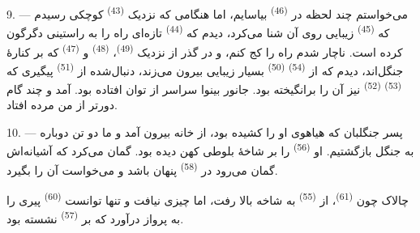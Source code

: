 \VUsaut{3.0mm}
\VUsaut{3.0mm}

9. --- می‌خواستم چند لحظه در 
\textsuperscript{(46)} بیاسایم، اما هنگامی که نزدیک 
\textsuperscript{(43)} کوچکی رسیدم که  \textsuperscript{(45)}
زیبایی روی آن شنا می‌کرد، دیدم که  \textsuperscript{(44)}
تازه‌ای راه را به  راستینی دگرگون کرده است. ناچار شدم
راه را کج کنم، و در گذر از نزدیک 
\textsuperscript{(49)}،  \textsuperscript{(48)} و
 \textsuperscript{(47)} که بر کنارهٔ جنگل‌اند، دیدم که
از  \textsuperscript{(54)} 
\textsuperscript{(50)} بسیار زیبایی بیرون می‌زند، دنبال‌شده از  \textsuperscript{(51)} پیگیری که 
\textsuperscript{(53)}  \textsuperscript{(52)} نیز
آن را برانگیخته بود. جانور بینوا سراسر از توان افتاده بود. آمد و چند
گام دورتر از من مرده افتاد.

10. --- پسر جنگلبان که هیاهوی  او را کشیده بود، از
خانه بیرون آمد و ما دو تن دوباره به جنگل بازگشتیم. او 
\textsuperscript{(56)} را بر شاخهٔ بلوطی کهن دیده بود. گمان می‌کرد که
آشیانه‌اش گمان می‌رود در  \textsuperscript{(58)}
پنهان باشد و می‌خواست آن را بگیرد.

چالاک چون  \textsuperscript{(61)}، از 
\textsuperscript{(55)} به شاخه بالا رفت، اما چیزی نیافت و تنها توانست
 \textsuperscript{(60)} پیری را به پرواز درآورد که بر
 \textsuperscript{(57)} نشسته بود.

\VUsaut{4.0mm}
\VUfilet{22mm}
